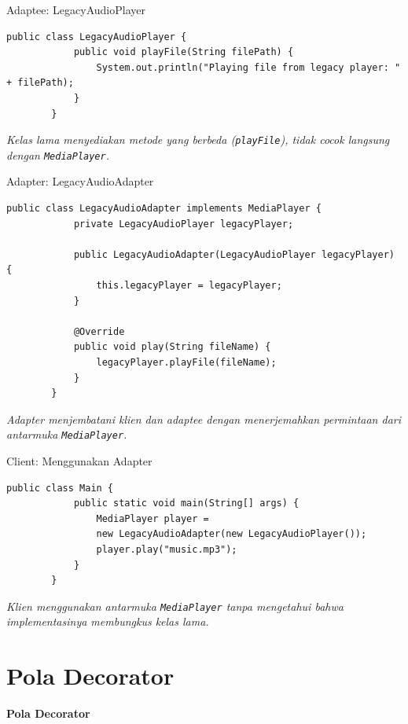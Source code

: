 \documentclass[aspectratio=169, table]{beamer}
\begin{document}
\begin{frame}[fragile]{Adaptee: LegacyAudioPlayer}
	\vspace{20pt}
	\begin{lstlisting}[style=JavaStyle]
		public class LegacyAudioPlayer {
			public void playFile(String filePath) {
				System.out.println("Playing file from legacy player: " + filePath);
			}
		}
	\end{lstlisting}
	\smallskip
	\textit{Kelas lama menyediakan metode yang berbeda (\texttt{playFile}), tidak cocok langsung dengan \texttt{MediaPlayer}.}
\end{frame}

\begin{frame}[fragile]{Adapter: LegacyAudioAdapter}
	\vspace{20pt}
	\begin{lstlisting}[style=JavaStyle]
		public class LegacyAudioAdapter implements MediaPlayer {
			private LegacyAudioPlayer legacyPlayer;
			
			public LegacyAudioAdapter(LegacyAudioPlayer legacyPlayer) {
				this.legacyPlayer = legacyPlayer;
			}
			
			@Override
			public void play(String fileName) {
				legacyPlayer.playFile(fileName);
			}
		}
	\end{lstlisting}
	\smallskip
	\textit{Adapter menjembatani klien dan adaptee dengan menerjemahkan permintaan dari antarmuka \texttt{MediaPlayer}.}
\end{frame}

\begin{frame}[fragile]{Client: Menggunakan Adapter}
	\vspace{20pt}
	\begin{lstlisting}[style=JavaStyle]
		public class Main {
			public static void main(String[] args) {
				MediaPlayer player =
				new LegacyAudioAdapter(new LegacyAudioPlayer());
				player.play("music.mp3");
			}
		}
	\end{lstlisting}
	\smallskip
	\textit{Klien menggunakan antarmuka \texttt{MediaPlayer} tanpa mengetahui bahwa implementasinya membungkus kelas lama.}
\end{frame}


\section{Pola Decorator}

\begin{frame}{\hfill}
	\centering
	\textbf{\Huge{Pola Decorator}}
\end{frame}
\end{document}
